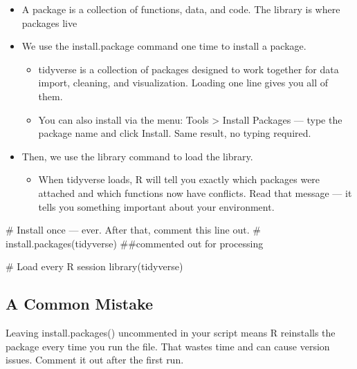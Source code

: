 \documentclass[
  letterpaper,
  DIV=11,
  numbers=noendperiod]{scrreprt}
\newenvironment{Shaded}{\begin{snugshade}}{\end{snugshade}}
\newcommand{\CommentTok}[1]{\textcolor[rgb]{0.37,0.37,0.37}{#1}}
\newcommand{\FunctionTok}[1]{\textcolor[rgb]{0.28,0.35,0.67}{#1}}
\newcommand{\NormalTok}[1]{\textcolor[rgb]{0.00,0.23,0.31}{#1}}
\providecommand{\tightlist}{%
  \setlength{\itemsep}{0pt}\setlength{\parskip}{0pt}}\usepackage{longtable,booktabs,array}
\begin{document}
\begin{itemize}
\tightlist
\item
  A package is a collection of functions, data, and code. The library is
  where packages live
\item
  We use the install.package command one time to install a package.

  \begin{itemize}
  \tightlist
  \item
    tidyverse is a collection of packages designed to work together for
    data import, cleaning, and visualization. Loading one line gives you
    all of them.
  \item
    You can also install via the menu: Tools \textgreater{} Install
    Packages --- type the package name and click Install. Same result,
    no typing required.
  \end{itemize}
\item
  Then, we use the library command to load the library.

  \begin{itemize}
  \tightlist
  \item
    When tidyverse loads, R will tell you exactly which packages were
    attached and which functions now have conflicts. Read that message
    --- it tells you something important about your environment.
  \end{itemize}
\end{itemize}

\begin{Shaded}
\begin{Highlighting}[]
\CommentTok{\# Install once — ever. After that, comment this line out.}
\CommentTok{\# install.packages(\textquotesingle{}tidyverse\textquotesingle{}) \#\#commented out for processing}

\CommentTok{\# Load every R session}
\FunctionTok{library}\NormalTok{(tidyverse)}
\end{Highlighting}
\end{Shaded}

\subsection{A Common Mistake}\label{a-common-mistake}

Leaving install.packages() uncommented in your script means R reinstalls
the package every time you run the file. That wastes time and can cause
version issues. Comment it out after the first run.
\end{document}
